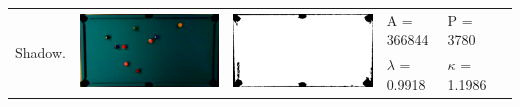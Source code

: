 \begin{tabular}{|l|c|c|l|l|c|}
\multirow{2}{*}{Shadow.} & \multirow{2}{*}{\includegraphics[scale=0.05]{../images/1/6_img.png}} & \multirow{2}{*}{\includegraphics[scale=0.05]{../images/1/6_mask.png}} & A = 366844 & P = 3780 & \multirow{2}{*}{}\\ 
& & & $\lambda$ = 0.9918 & $\kappa$ = 1.1986 & \\
\hline


\end{tabular}
